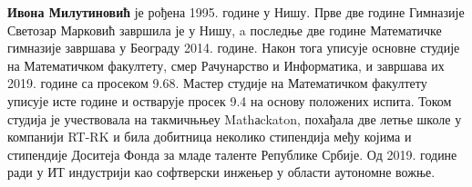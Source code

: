 \documentclass[12pt,oneside]{memoir}
\begin{document}
\begin{biografija}
\textbf{Ивона Милутиновић} је рођена 1995. године у Нишу. 
Прве две године Гимназије Светозар Марковић завршила је у Нишу, a последње две године Математичке гимназије завршава у Београду 2014. године. 
Након тога уписује основне студије на Математичком факултету, смер Рачунарство и Информатика, и завршава их 2019. године са просеком 9.68. Мастер студије на Математичком факултету уписује исте године и остварује просек 9.4 на основу положених испита. Током студија је учествовала на такмичњњеу Mathаckaton, похађала две летње школе у компанији RT-RK и била добитница неколико стипендија међу којима и стипендије Доситеја Фонда за младе таленте Републике Србије.
Од 2019. године ради у ИТ индустрији као софтверски инжењер у области аутономне вожње.
\end{biografija}
\end{document}
